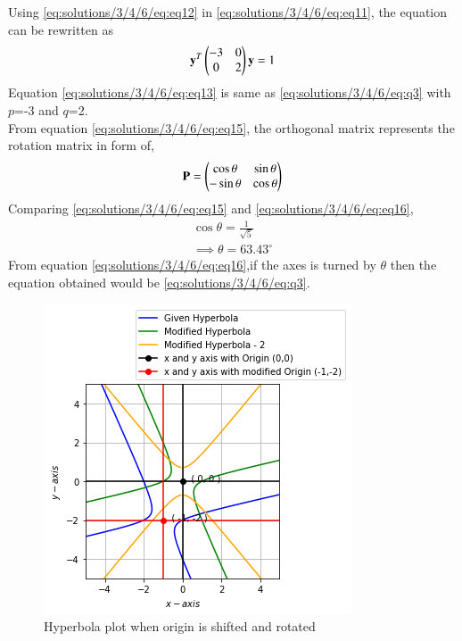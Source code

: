 Using \eqref{eq:solutions/3/4/6/eq:eq12} in \eqref{eq:solutions/3/4/6/eq:eq11}, the equation can be rewritten as
\begin{align}
     \mathbf{y}^T\begin{pmatrix}-3&0\\0&2\end{pmatrix}\mathbf{y}=1 \label{eq:solutions/3/4/6/eq:eq13}
\end{align}
Equation \eqref{eq:solutions/3/4/6/eq:eq13} is same as \eqref{eq:solutions/3/4/6/eq:q3} with $p$=-3 and $q$=2.\\
From equation \eqref{eq:solutions/3/4/6/eq:eq15}, the orthogonal matrix represents the rotation matrix in form of,
\begin{align}
    \mathbf{P}=\begin{pmatrix}\cos\theta & \sin\theta\\ -\sin\theta& \cos\theta\end{pmatrix} \label{eq:solutions/3/4/6/eq:eq16}
\end{align}
Comparing \eqref{eq:solutions/3/4/6/eq:eq15} and \eqref{eq:solutions/3/4/6/eq:eq16},
\begin{align}
    \cos\theta = \frac{1}{\sqrt{5}}\\
    \implies \boxed{\theta = 63.43^{\circ}}
\end{align}
From equation \eqref{eq:solutions/3/4/6/eq:eq16},if the axes is turned by $\theta$ then the equation obtained would be \eqref{eq:solutions/3/4/6/eq:q3}.
\renewcommand{\thefigure}{\arabic{figure}}
\begin{figure}[h!]
	\centering
	\includegraphics[width=\columnwidth]{./solutions/3/4/6/hyperbola.png}
	\caption{Hyperbola plot when origin is shifted and rotated}
	\label{eq:solutions/3/4/6/myfig}
\end{figure}

